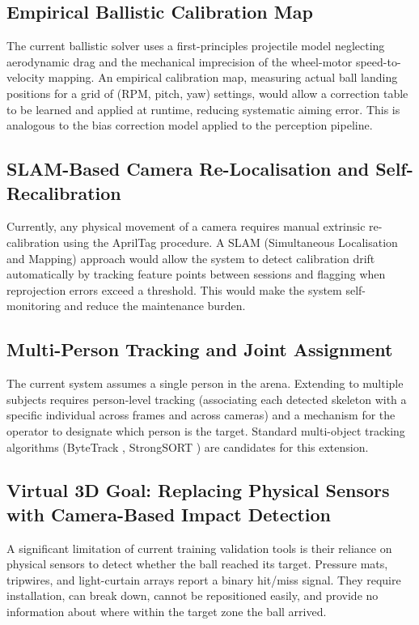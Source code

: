 \subsection{Empirical Ballistic Calibration Map}

The current ballistic solver uses a first-principles projectile model neglecting aerodynamic drag and the mechanical imprecision of the wheel-motor speed-to-velocity mapping. An empirical calibration map, measuring actual ball landing positions for a grid of (RPM, pitch, yaw) settings, would allow a correction table to be learned and applied at runtime, reducing systematic aiming error. This is analogous to the bias correction model applied to the perception pipeline.

\subsection{SLAM-Based Camera Re-Localisation and Self-Recalibration}

Currently, any physical movement of a camera requires manual extrinsic re-calibration using the AprilTag procedure. A SLAM (Simultaneous Localisation and Mapping) \cite{ref36} approach would allow the system to detect calibration drift automatically by tracking feature points between sessions and flagging when reprojection errors exceed a threshold. This would make the system self-monitoring and reduce the maintenance burden.

\subsection{Multi-Person Tracking and Joint Assignment}

The current system assumes a single person in the arena. Extending to multiple subjects requires person-level tracking (associating each detected skeleton with a specific individual across frames and across cameras) and a mechanism for the operator to designate which person is the target. Standard multi-object tracking algorithms (ByteTrack \cite{ref33}, StrongSORT \cite{ref34}) are candidates for this extension.

\subsection{Virtual 3D Goal: Replacing Physical Sensors with Camera-Based Impact Detection}

A significant limitation of current training validation tools is their reliance on physical sensors to detect whether the ball reached its target. Pressure mats, tripwires, and light-curtain arrays report a binary hit/miss signal. They require installation, can break down, cannot be repositioned easily, and provide no information about where within the target zone the ball arrived.

